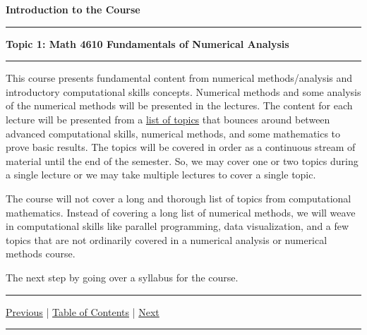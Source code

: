 \documentclass[10pt,fleqn]{article}
\begin{document}
\noindent
{\bf{\Large Introduction to the Course }}
\vskip0.1in\hrule\vskip0.1in
\noindent
{\bf Topic 1: Math 4610 Fundamentals of Numerical Analysis} 
\vskip0.1in\hrule\vskip0.1in \noindent
This course presents fundamental content from numerical methods/analysis and
introductory computational skills concepts. Numerical methods and some analysis
of the numerical methods will be presented in the lectures. The content for each
lecture will be presented from a
\href{../../toc/md/topic_toc.md}{list of topics} that bounces around between
advanced computational skills, numerical methods, and some mathematics to prove
basic results. The topics will be covered in order as a continuous stream of
material until the end of the semester. So, we may cover one or two topics
during a single lecture or we may take multiple lectures to cover a single
topic.

The course will not cover a long and thorough list of topics from computational
mathematics. Instead of covering a long list of numerical methods, we will weave
in computational skills like parallel programming, data visualization, and a few
topics that are not ordinarily covered in a numerical analysis or numerical
methods course.

The next step by going over a syllabus for the course.

\vskip0.1in\hrule\vskip0.1in \noindent
  \href{./embed_xx.md}{Previous} |
  \href{./embed_xx.md}{Table of Contents} |
  \href{./embed_xx.md}{Next}
\vskip0.1in\hrule\vskip0.1in \noindent

\end{document}
